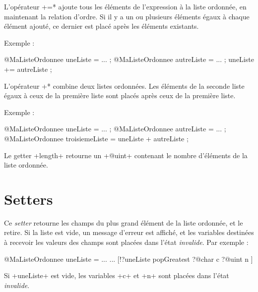 L'opérateur \ggs*+=* ajoute tous les éléments de l'expression à la liste ordonnée, en maintenant la relation d'ordre. Si il y a un ou plusieurs éléments égaux à chaque élément ajouté, ce dernier est placé après les éléments existants. 

Exemple :
\begin{galgas}
@MaListeOrdonnee uneListe = ... ;
@MaListeOrdonnee autreListe = ... ;
uneListe += autreListe ;
\end{galgas}


L'opérateur \ggs*+* combine deux listes ordonnées. Les éléments de la seconde liste égaux à ceux de la première liste sont placés après ceux de la première liste.

Exemple :
\begin{galgas}
@MaListeOrdonnee uneListe = ... ;
@MaListeOrdonnee autreListe = ... ;
@MaListeOrdonnee troisiemeListe = uneListe + autreListe ;
\end{galgas}








Le getter \ggs+length+ retourne un \ggs+@uint+ contenant le nombre d'éléments de la liste ordonnée.






\section{Setters}


Ce \emph{setter} retourne les champs du plus grand élément de la liste ordonnée, et le retire. Si la liste est vide, un message d'erreur est affiché, et les variables destinées à recevoir les valeurs des champs sont placées dans l'état \emph{invalide}. Par exemple :

\begin{galgas}
@MaListeOrdonnee uneListe = ...
...
[!?uneListe popGreatest
  ?@char c
  ?@uint n
]
\end{galgas}

Si \ggs+uneListe+ est vide, les variables \ggs+c+ et \ggs+n+ sont placées dans l'état \emph{invalide}.


